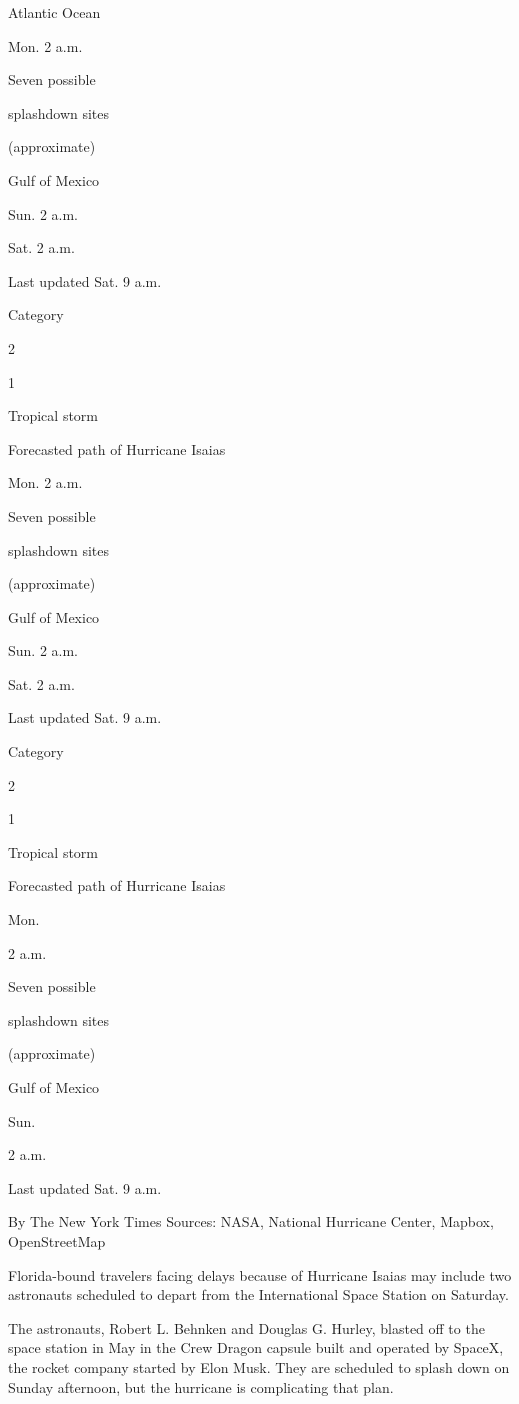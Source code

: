 Atlantic Ocean

Mon. 2 a.m.

Seven possible

splashdown sites

(approximate)

Gulf of Mexico

Sun. 2 a.m.

Sat. 2 a.m.

Last updated Sat. 9 a.m.

Category

2

1

Tropical storm

Forecasted path of Hurricane Isaias

Mon. 2 a.m.

Seven possible

splashdown sites

(approximate)

Gulf of Mexico

Sun. 2 a.m.

Sat. 2 a.m.

Last updated Sat. 9 a.m.

Category

2

1

Tropical storm

Forecasted path of Hurricane Isaias

Mon.

2 a.m.

Seven possible

splashdown sites

(approximate)

Gulf of Mexico

Sun.

2 a.m.

Last updated Sat. 9 a.m.

By The New York Times \textbar{} Sources: NASA, National Hurricane
Center, Mapbox, OpenStreetMap

Florida-bound travelers facing delays because of Hurricane Isaias may
include two astronauts scheduled to depart from the International Space
Station on Saturday.

The astronauts, Robert L. Behnken and Douglas G. Hurley, blasted off to
the space station in May in the Crew Dragon capsule built and operated
by SpaceX, the rocket company started by Elon Musk. They are scheduled
to splash down on Sunday afternoon, but the hurricane is complicating
that plan.

